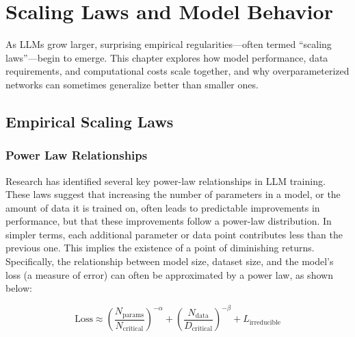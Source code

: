 \chapter{Scaling Laws and Model Behavior}
\label{chap:scaling_laws}

\noindent
As LLMs grow larger, surprising empirical regularities---often termed ``scaling laws''---begin to emerge. This chapter explores how model performance, data requirements, and computational costs scale together, and why overparameterized networks can sometimes generalize better than smaller ones.

\section{Empirical Scaling Laws}
\label{sec:empirical_scaling}

\subsection{Power Law Relationships}
\noindent
Research has identified several key power-law relationships in LLM training. These laws suggest that increasing the number of parameters in a model, or the amount of data it is trained on, often leads to predictable improvements in performance, but that these improvements follow a power-law distribution. In simpler terms, each additional parameter or data point contributes less than the previous one. This implies the existence of a point of diminishing returns. Specifically, the relationship between model size, dataset size, and the model's loss (a measure of error) can often be approximated by a power law, as shown below:

\begin{equation}\label{eq:loss_scaling}
\text{Loss} \approx \left(\frac{N_{\text{params}}}{N_{\text{critical}}}\right)^{-\alpha} + \left(\frac{N_{\text{data}}}{D_{\text{critical}}}\right)^{-\beta} + L_{\text{irreducible}}
\end{equation}

